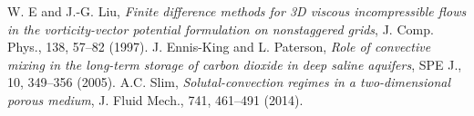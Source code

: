 \documentclass[11pt, a4paper]{csiroreport2012}
\begin{document}
\clearpage

%
\begin{thebibliography}{9}
W. E and J.-G. Liu, \emph{Finite difference methods for 3D viscous incompressible flows in the vorticity-vector potential formulation on nonstaggered grids}, J. Comp. Phys., 138, 57--82 (1997).
J. Ennis-King and L. Paterson,  \emph{Role of convective mixing in the long-term storage of carbon dioxide in deep saline aquifers}, SPE J., 10, 349--356 (2005).
A.C. Slim,  \emph{Solutal-convection regimes in a two-dimensional porous medium}, J. Fluid Mech., 741, 461--491 (2014).
\end{thebibliography}
\end{document}
